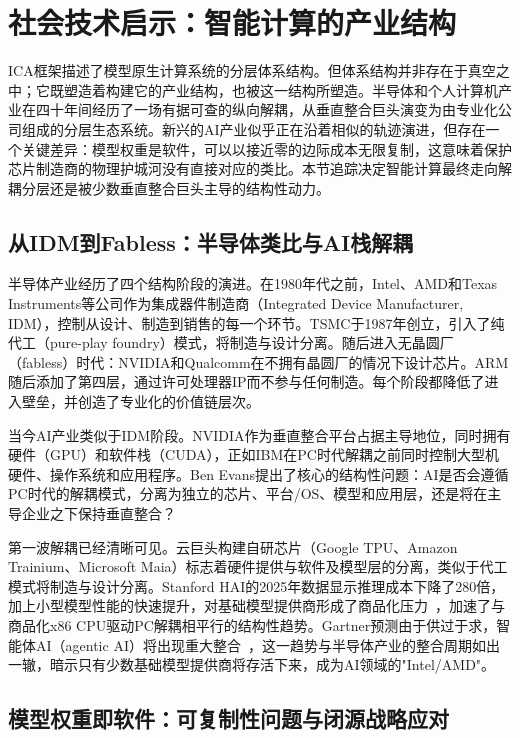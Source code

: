 \section{社会技术启示：智能计算的产业结构}
\label{sec:sociotechnical}

ICA框架描述了模型原生计算系统的分层体系结构。但体系结构并非存在于真空之中；它既塑造着构建它的产业结构，也被这一结构所塑造。半导体和个人计算机产业在四十年间经历了一场有据可查的纵向解耦，从垂直整合巨头演变为由专业化公司组成的分层生态系统。新兴的AI产业似乎正在沿着相似的轨迹演进，但存在一个关键差异：模型权重是软件，可以以接近零的边际成本无限复制，这意味着保护芯片制造商的物理护城河没有直接对应的类比。本节追踪决定智能计算最终走向解耦分层还是被少数垂直整合巨头主导的结构性动力。

\subsection{从IDM到Fabless：半导体类比与AI栈解耦}
\label{sec:idm-fabless}

半导体产业经历了四个结构阶段的演进。在1980年代之前，Intel、AMD和Texas Instruments等公司作为集成器件制造商（Integrated Device Manufacturer, IDM），控制从设计、制造到销售的每一个环节。TSMC于1987年创立，引入了纯代工（pure-play foundry）模式，将制造与设计分离。随后进入无晶圆厂（fabless）时代：NVIDIA和Qualcomm在不拥有晶圆厂的情况下设计芯片。ARM随后添加了第四层，通过许可处理器IP而不参与任何制造。每个阶段都降低了进入壁垒，并创造了专业化的价值链层次。

当今AI产业类似于IDM阶段。NVIDIA作为垂直整合平台占据主导地位，同时拥有硬件（GPU）和软件栈（CUDA），正如IBM在PC时代解耦之前同时控制大型机硬件、操作系统和应用程序。Ben Evans提出了核心的结构性问题：AI是否会遵循PC时代的解耦模式，分离为独立的芯片、平台/OS、模型和应用层，还是将在主导企业之下保持垂直整合？

第一波解耦已经清晰可见。云巨头构建自研芯片（Google TPU、Amazon Trainium、Microsoft Maia）标志着硬件提供与软件及模型层的分离，类似于代工模式将制造与设计分离。Stanford HAI的2025年数据显示推理成本下降了280倍，加上小型模型性能的快速提升，对基础模型提供商形成了商品化压力~\cite{stanfordhai2025index}，加速了与商品化x86 CPU驱动PC解耦相平行的结构性趋势。Gartner预测由于供过于求，智能体AI（agentic AI）将出现重大整合~\cite{gartner2026trends}，这一趋势与半导体产业的整合周期如出一辙，暗示只有少数基础模型提供商将存活下来，成为AI领域的"Intel/AMD"。

\subsection{模型权重即软件：可复制性问题与闭源战略应对}
\label{sec:copyability}

